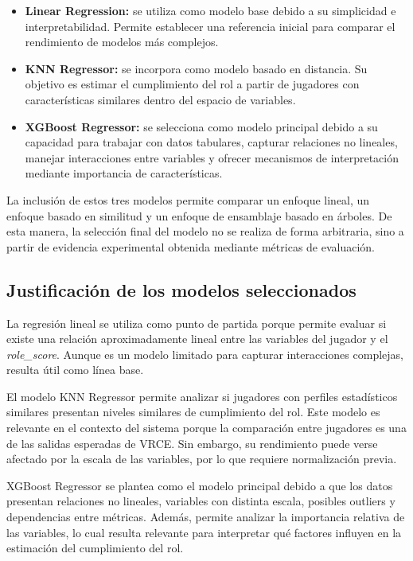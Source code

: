 \documentclass{ULBreport} %
\begin{document}
\begin{itemize}
    \item \textbf{Linear Regression:} se utiliza como modelo base debido a su simplicidad e interpretabilidad. Permite establecer una referencia inicial para comparar el rendimiento de modelos más complejos.
    
    \item \textbf{KNN Regressor:} se incorpora como modelo basado en distancia. Su objetivo es estimar el cumplimiento del rol a partir de jugadores con características similares dentro del espacio de variables.
    
    \item \textbf{XGBoost Regressor:} se selecciona como modelo principal debido a su capacidad para trabajar con datos tabulares, capturar relaciones no lineales, manejar interacciones entre variables y ofrecer mecanismos de interpretación mediante importancia de características.
\end{itemize}

La inclusión de estos tres modelos permite comparar un enfoque lineal, un enfoque basado en similitud y un enfoque de ensamblaje basado en árboles. De esta manera, la selección final del modelo no se realiza de forma arbitraria, sino a partir de evidencia experimental obtenida mediante métricas de evaluación.

\subsection{Justificación de los modelos seleccionados}

La regresión lineal se utiliza como punto de partida porque permite evaluar si existe una relación aproximadamente lineal entre las variables del jugador y el \textit{role\_score}. Aunque es un modelo limitado para capturar interacciones complejas, resulta útil como línea base.

El modelo KNN Regressor permite analizar si jugadores con perfiles estadísticos similares presentan niveles similares de cumplimiento del rol. Este modelo es relevante en el contexto del sistema porque la comparación entre jugadores es una de las salidas esperadas de VRCE. Sin embargo, su rendimiento puede verse afectado por la escala de las variables, por lo que requiere normalización previa.

XGBoost Regressor se plantea como el modelo principal debido a que los datos presentan relaciones no lineales, variables con distinta escala, posibles outliers y dependencias entre métricas. Además, permite analizar la importancia relativa de las variables, lo cual resulta relevante para interpretar qué factores influyen en la estimación del cumplimiento del rol.
\end{document}

